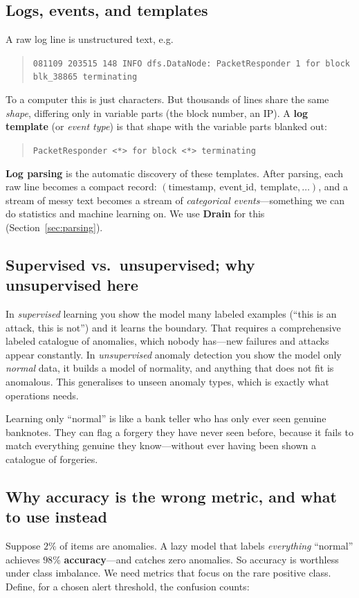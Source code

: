 \documentclass[11pt,a4paper]{article}
\newcommand{\keyword}[1]{\textbf{\color{accent}#1}}
\newcommand{\code}[1]{\texttt{\small #1}}
\begin{document}
\subsection{Logs, events, and templates}
A raw log line is unstructured text, e.g.
\begin{quote}\code{081109 203515 148 INFO dfs.DataNode: PacketResponder 1 for
block blk\_38865 terminating}\end{quote}
To a computer this is just characters. But thousands of lines share the same
\emph{shape}, differing only in variable parts (the block number, an IP). A
\keyword{log template} (or \emph{event type}) is that shape with the variable
parts blanked out:
\begin{quote}\code{PacketResponder <*> for block <*> terminating}\end{quote}
\keyword{Log parsing} is the automatic discovery of these templates. After
parsing, each raw line becomes a compact record:
$(\text{timestamp},\ \text{event\_id},\ \text{template},\dots)$, and a stream of
messy text becomes a stream of \emph{categorical events}---something we can do
statistics and machine learning on. We use \keyword{Drain} for this
(Section~\ref{sec:parsing}).

\subsection{Supervised vs.\ unsupervised; why unsupervised here}
In \emph{supervised} learning you show the model many labeled examples
(``this is an attack, this is not'') and it learns the boundary. That requires a
comprehensive labeled catalogue of anomalies, which nobody has---new failures and
attacks appear constantly. In \emph{unsupervised} anomaly detection you show the
model only \emph{normal} data, it builds a model of normality, and anything that
does not fit is anomalous. This generalises to unseen anomaly types, which is
exactly what operations needs.

\begin{intuition}
Learning only ``normal'' is like a bank teller who has only ever seen genuine
banknotes. They can flag a forgery they have never seen before, because it fails
to match everything genuine they know---without ever having been shown a
catalogue of forgeries.
\end{intuition}

\subsection{Why accuracy is the wrong metric, and what to use instead}
\label{sec:primer-metrics}
Suppose $2\%$ of items are anomalies. A lazy model that labels \emph{everything}
``normal'' achieves $98\%$ \keyword{accuracy}---and catches zero anomalies. So
accuracy is worthless under class imbalance. We need metrics that focus on the
rare positive class. Define, for a chosen alert threshold, the confusion counts:
\end{document}
